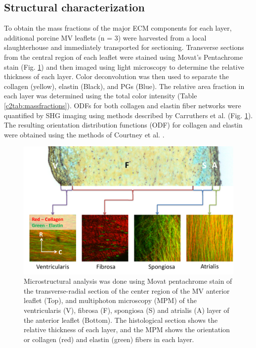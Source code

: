 






\subsection{Structural characterization} \label{c2sec:structure}

    To obtain the mass fractions of the major ECM components for each layer, additional porcine MV leaflets (n = 3) were harvested from a local slaughterhouse and immediately transported for sectioning. Transverse sections from the central region of each leaflet were stained using Movat’s Pentachrome stain (Fig. \ref{c2:fig:2}) and then imaged using light microscopy to determine the relative thickness of each layer. Color deconvolution was then used to separate the collagen (yellow), elastin (Black), and PGs (Blue). The relative area fraction in each layer was determined using the total color intensity (Table \ref{c2tab:massfractions}). ODFs for both collagen and elastin fiber networks were quantified by SHG imaging using methods described by Carruthers et al. \cite{carruthers_alterations_2012} (Fig. \ref{c2:fig:2}). The resulting orientation distribution functions (ODF) for collagen and elastin were obtained using the methods of Courtney et al. \cite{courtney_design_2006}.
    
    


\begin{figure}
\centering
\includegraphics[width=\textwidth]{Images/chapter2/figure2.pdf}
\caption{Microstructural analysis was done using Movat pentachrome stain of the transverse-radial section of the center region of the MV anterior leaflet (Top), and multiphoton microscopy (MPM) of the ventricularis (V), fibrosa (F), spongiosa (S) and atrialis (A) layer of the anterior leaflet (Bottom). The histological section shows the relative thickness of each layer, and the MPM shows the orientation or collagen (red) and elastin (green) fibers in each layer.}
\label{c2:fig:2}
\end{figure}



